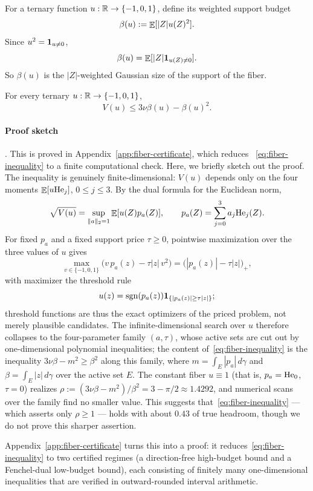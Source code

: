 For a ternary function $u:\mathbb{R}\to\{-1,0,1\}$, define its weighted support budget
\[
        \beta(u):=\mathop{\mathbb{E}}[|Z|u(Z)^2].
\]
Since $u^2=\mathbf 1_{u\neq0}$,
\[
        \beta(u)=\mathop{\mathbb{E}}[|Z|\mathbf 1_{u(Z)\neq0}].
\]
So $\beta(u)$ is the $|Z|$-weighted Gaussian size of the support of the fiber.

\begin{theorem}
For every ternary $u:\mathbb{R}\to\{-1,0,1\}$,
\begin{equation}
        V(u)\le 3\nu\beta(u)-\beta(u)^2.
        \label{eq:fiber-inequality}
\end{equation}
\end{theorem}


\paragraph{Proof sketch}. This is proved in Appendix~\ref{app:fiber-certificate}, which reduces ~\eqref{eq:fiber-inequality} to a finite computational check. Here, we briefly sketch out the proof. The inequality is genuinely finite-dimensional: $V(u)$ depends only on the four moments $\mathop{\mathbb{E}}[u\mathrm{He}_j]$, $0\le j\le3$. By the dual formula for the Euclidean norm,
\[
        \sqrt{V(u)}=\sup_{\lVert a\rVert_2=1}\mathop{\mathbb{E}}[u(Z)p_a(Z)],
        \qquad
        p_a(Z)=\sum_{j=0}^3a_j\mathrm{He}_j(Z).
\]
For fixed $p_a$ and a fixed support price $\tau\ge0$, pointwise maximization over the three values of $u$ gives
\[
        \max_{v\in\{-1,0,1\}}\bigl(v\,p_a(z)-\tau|z|\,v^2\bigr)
        =\bigl(|p_a(z)|-\tau|z|\bigr)_+,
\]
with maximizer the threshold rule
\[
        u(z)=\operatorname{sgn}(p_a(z))\mathbf 1_{\{|p_a(z)|\ge \tau |z|\}};
\]
threshold functions are thus the exact optimizers of the priced problem, not merely plausible candidates. The infinite-dimensional search over $u$ therefore collapses to the four-parameter family $(a,\tau)$, whose active sets are cut out by one-dimensional polynomial inequalities; the content of~\eqref{eq:fiber-inequality} is the inequality $3\nu\beta-m^2\ge\beta^2$ along this family, where $m=\int_E|p_a|\,d\gamma$ and $\beta=\int_E|z|\,d\gamma$ over the active set $E$. The constant fiber $u\equiv1$ (that is, $p_a=\mathrm{He}_0$, $\tau=0$) realizes $\rho:=(3\nu\beta-m^2)/\beta^2=3-\pi/2\approx1.4292$, and numerical scans over the family find no smaller value. This suggests that~\eqref{eq:fiber-inequality} --- which asserts only $\rho\ge1$ --- holds with about $0.43$ of true headroom, though we do not prove this sharper assertion.

Appendix~\ref{app:fiber-certificate} turns this into a proof: it reduces~\eqref{eq:fiber-inequality} to two certified regimes (a direction-free high-budget bound and a Fenchel-dual low-budget bound), each consisting of finitely many one-dimensional inequalities that are verified in outward-rounded interval arithmetic. 

